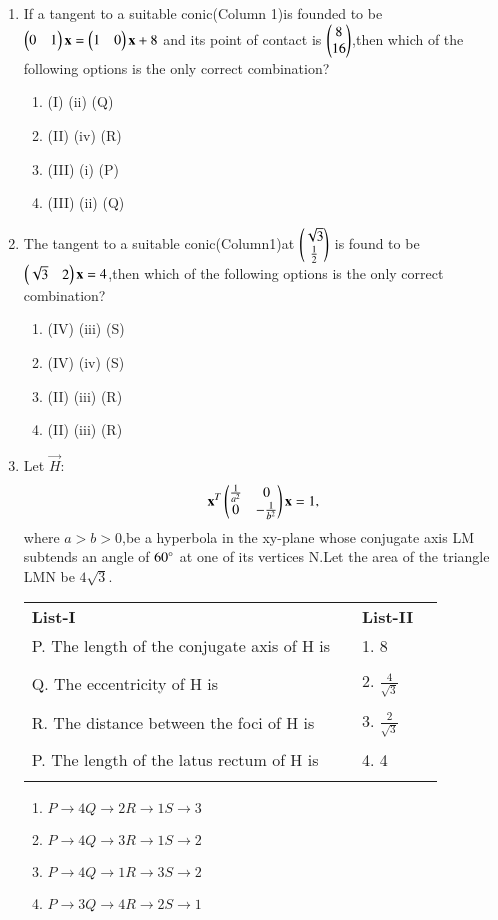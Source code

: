 \documentclass[journal,12pt,twocolumn]{IEEEtran}
\begin{document}
\begin{enumerate}[label=\arabic*]
\begin{enumerate}
    \end{enumerate}
    \item If a tangent to a suitable conic(Column 1)is founded to be $\begin{pmatrix}0&1\end{pmatrix}\mathbf{x}=\begin{pmatrix}1&0\end{pmatrix}\mathbf{x}+8$ and its point of contact is $\begin{pmatrix}8\\16\end{pmatrix}$,then which of the following options is the only correct combination?
    \begin{enumerate}
    \item (I)  (ii)  (Q)
    \item (II)  (iv)  (R)
    \item (III)  (i)  (P)
    \item (III)  (ii)  (Q)
    \end{enumerate}
    \item The tangent to a suitable conic(Column1)at $\begin{pmatrix}\sqrt{3}\\\frac{1}{2}\end{pmatrix}$ is found to be 
    $\begin{pmatrix}\sqrt{3}&2\end{pmatrix}\mathbf{x}=4$,then which of the following options is the only correct combination?
    \begin{enumerate}
    \item (IV)  (iii)  (S)
    \item (IV)  (iv)  (S)
    \item (II)  (iii)  (R) 
    \item (II)  (iii)  (R)
    \end{enumerate}
    \item Let $\vec{H}$:
    \begin{align}
    \mathbf{x}^T\begin{pmatrix}\frac{1}{a^2}&0\\0&-\frac{1}{b^2}\end{pmatrix}\mathbf{x}=1,
    \end{align} where $a>b>0$,be a hyperbola in the xy-plane whose conjugate axis LM subtends an angle of $60\degree$ at one of its vertices N.Let the area of the triangle LMN be $4\sqrt{3}$.
    \begin{tabular}{llll}
    \textbf{List-I} &\enspace &\textbf{List-II}\\
    P. The length of the conjugate axis of H is &\enspace &1. 8\\ &&&\\
    Q. The eccentricity of H is &\enspace &2. $\frac{4}{\sqrt{3}}$\\ &&&\\
    R. The distance between the foci of H is & \enspace & 
    3. $\frac{2}{\sqrt{3}}$\\ &&&\\
    P. The length of the latus rectum of H is&\enspace &   4. 4\\ &&&\\
    \end{tabular}
    \begin{enumerate}
    \item $P\to4 Q\to2 R\to1 S\to3$
    \item $P\to4 Q\to3 R\to1 S\to2$
    \item $P\to4 Q\to1 R\to3 S\to2$
    \item $P\to3 Q\to4 R\to2 S\to1$
    \end{enumerate}
    
    \end{enumerate}
    
\end{document}
